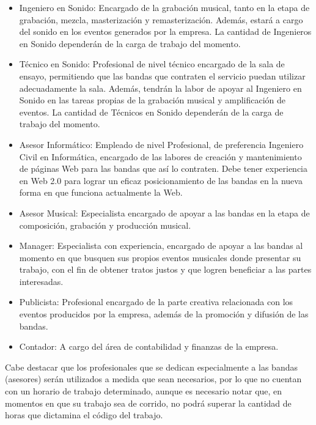 \begin{itemize}

\item Ingeniero en Sonido: Encargado de la grabación musical, tanto
      en la etapa de grabación, mezcla, masterización y remasterización.
      Además, estará a cargo del sonido en los eventos generados
      por la empresa. La cantidad de Ingenieros en Sonido dependerán
      de la carga de trabajo del momento.

\item Técnico en Sonido: Profesional de nivel técnico encargado
	de la sala de ensayo, permitiendo que las bandas que 
	contraten el servicio puedan utilizar adecuadamente
	la sala. Además, tendrán la labor de apoyar al Ingeniero en Sonido
	en las tareas propias de la grabación musical y amplificación de 
	eventos. La cantidad de Técnicos en Sonido dependerán de la carga 
	de trabajo del momento.

\item Asesor Informático: Empleado de nivel Profesional, de preferencia
      Ingeniero Civil en Informática, encargado de las labores de creación y 
      mantenimiento de páginas Web para las bandas que así lo contraten. Debe
      tener experiencia en Web 2.0 para lograr un eficaz posicionamiento
      de las bandas en la nueva forma en que funciona actualmente la Web.

\item Asesor Musical: Especialista encargado de apoyar a las bandas
      en la etapa de composición, grabación y producción musical.

\item Manager: Especialista con experiencia, encargado de apoyar a las bandas 
      al momento en que busquen sus propios eventos musicales donde presentar
      su trabajo, con el fin de obtener tratos justos y que logren
      beneficiar a las partes interesadas.

\item Publicista: Profesional encargado de la parte creativa relacionada
      con los eventos producidos por la empresa, además de la promoción
      y difusión de las bandas.

\item Contador: A cargo del área de contabilidad y finanzas de la
      empresa.
\end{itemize}


Cabe destacar que los profesionales que se dedican especialmente 
a las bandas (asesores) serán utilizados a medida que sean necesarios, 
por lo que no cuentan con un horario de trabajo determinado, aunque es necesario
notar que, en momentos en que su trabajo sea de corrido, no podrá superar la cantidad
de horas que dictamina el código del trabajo.

